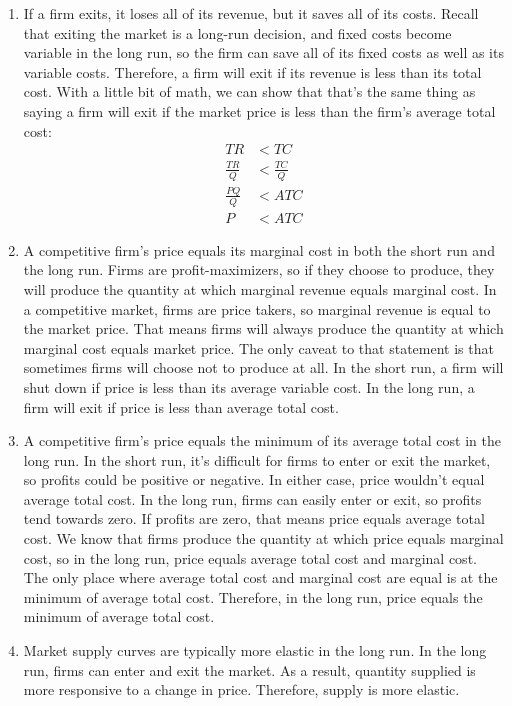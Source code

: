 \documentclass{article}
\begin{document}
\begin{enumerate}
\item If a firm exits, it loses all of its revenue, but it saves all of its costs. Recall that exiting the market is a long-run decision, and fixed costs become variable in the long run, so the firm can save all of its fixed costs as well as its variable costs. Therefore, a firm will exit if its revenue is less than its total cost. With a little bit of math, we can show that that's the same thing as saying a firm will exit if the market price is less than the firm's average total cost:
	\begin{align*}
	TR &< TC \\
	\frac{TR}{Q} &< \frac{TC}{Q} \\
	\frac{PQ}{Q} &< ATC \\
	P &< ATC
	\end{align*}
	
\item A competitive firm's price equals its marginal cost in both the short run and the long run. Firms are profit-maximizers, so if they choose to produce, they will produce the quantity at which marginal revenue equals marginal cost. In a competitive market, firms are price takers, so marginal revenue is equal to the market price. That means firms will always produce the quantity at which marginal cost equals market price. The only caveat to that statement is that sometimes firms will choose not to produce at all. In the short run, a firm will shut down if price is less than its average variable cost. In the long run, a firm will exit if price is less than average total cost.

\item A competitive firm's price equals the minimum of its average total cost in the long run. In the short run, it's difficult for firms to enter or exit the market, so profits could be positive or negative. In either case, price wouldn't equal average total cost. In the long run, firms can easily enter or exit, so profits tend towards zero. If profits are zero, that means price equals average total cost. We know that firms produce the quantity at which price equals marginal cost, so in the long run, price equals average total cost and marginal cost. The only place where average total cost and marginal cost are equal is at the minimum of average total cost. Therefore, in the long run, price equals the minimum of average total cost.

\item Market supply curves are typically more elastic in the long run. In the long run, firms can enter and exit the market. As a result, quantity supplied is more responsive to a change in price. Therefore, supply is more elastic.

\end{enumerate}
\end{document}
